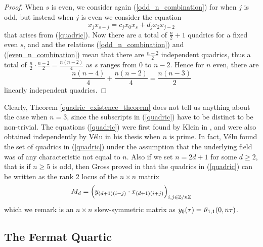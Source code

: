 \begin{proof}
	When $s$ is even, we consider again (\ref{odd_n_combination}) for when $j$ is odd, but instead when $j$ is even we consider the equation
	\begin{equation}
	\label{even_n_combination}
		x_{j}x_{s-j} = c_{j}x_{0}x_{s} + d_{j}x_{2}x_{j-2}
	\end{equation}
	that arises from ({\ref{quadric}}). Now there are a total of $\tfrac{n}{2} + 1$ quadrics for a fixed even $s$, and and the relations (\ref{odd_n_combination}) and (\ref{even_n_combination}) mean that there are $\tfrac{n-2}{2}$ independent quadrics, thus a total of $\tfrac{n}{2}\cdot \tfrac{n-2}{2} = \tfrac{n(n-2)}{4}$ as $s$ ranges from 0 to $n-2$. Hence for $n$ even, there are
	\begin{equation*}
		\frac{n(n-4)}{4} + \frac{n(n-2)}{4} = \frac{n(n-3)}{2}
	\end{equation*}
	linearly independent quadrics.
\end{proof}

Clearly, Theorem \ref{quadric_existence_theorem} does not tell us anything about the case when $n = 3$, since the subscripts in (\ref{quadric}) have to be distinct to be non-trivial. The equations (\ref{quadric}) were first found by Klein in \cite{KF_1892}, and were also obtained independently by V{\'e}lu \cite{Velu_1978} in his thesis when $n$ is prime. In fact, V{\'e}lu found the set of quadrics in (\ref{quadric}) under the assumption that the underlying field was of any characteristic not equal to $n$. Also if we set $n = 2d + 1$ for some $d\geq 2$, that is if $n\geq 5$ is odd, then Gross proved in \cite{Gross_1996} that the quadrics in (\ref{quadric}) can be written as the rank 2 locus of the $n \times n$ matrix
\begin{equation}
	\label{gross_matrix}
	M_{d} = \Big( y_{(d+1)(i-j)} \cdot x_{(d+1)(i+j)}  \Big)_{i,j \in \mathbb{Z}/n\mathbb{Z}}
\end{equation}
which we remark is an $n\times n$ skew-symmetric matrix as $y_{0}(\tau) = \vartheta_{1,1}(0,n\tau)$.
 
\subsection{The Fermat Quartic}

